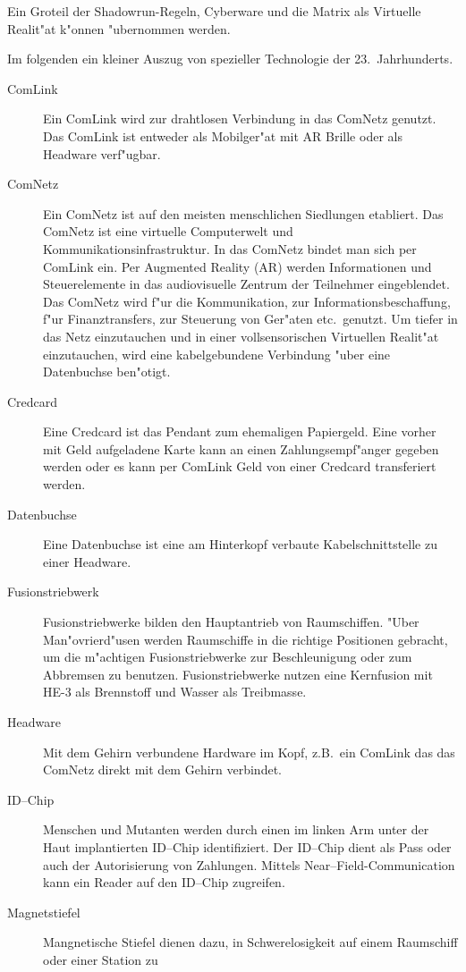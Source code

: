 \begin{appendices}
Ein Gro\3teil der Shadowrun-Regeln, Cyberware und die Matrix als Virtuelle Realit"at k"onnen "ubernommen werden.

Im folgenden ein kleiner Auszug von spezieller Technologie der 23.~Jahrhunderts.

\begin{description}
\item [ComLink] Ein ComLink wird zur drahtlosen Verbindung in das ComNetz genutzt. Das ComLink ist entweder als
      Mobilger"at mit AR Brille oder als Headware verf"ugbar.
\item [ComNetz] Ein ComNetz ist auf den meisten menschlichen Siedlungen etabliert. Das ComNetz ist eine virtuelle
      Computerwelt und Kommunikationsinfrastruktur. In das ComNetz bindet man sich per ComLink ein. Per Augmented Reality (AR) werden Informationen und Steuerelemente in das audiovisuelle Zentrum der Teilnehmer eingeblendet. Das ComNetz wird f"ur die Kommunikation, zur Informationsbeschaffung, f"ur Finanztransfers, zur Steuerung von Ger"aten etc.~genutzt. Um tiefer in das Netz einzutauchen und in einer vollsensorischen Virtuellen Realit"at einzutauchen, wird eine kabelgebundene Verbindung "uber eine Datenbuchse ben"otigt.
\item [Credcard] Eine Credcard ist das Pendant zum ehemaligen Papiergeld. Eine vorher mit Geld aufgeladene Karte kann an
      einen Zahlungsempf"anger gegeben werden oder es kann per ComLink Geld von einer Credcard transferiert werden.
\item [Datenbuchse] Eine Datenbuchse ist eine am Hinterkopf verbaute Kabelschnittstelle zu einer Headware.
\item [Fusionstriebwerk] Fusionstriebwerke bilden den Hauptantrieb von Raumschiffen. "Uber Man"ovrierd"usen werden
      Raumschiffe in die richtige Positionen gebracht, um die m"achtigen Fusionstriebwerke zur Beschleunigung oder zum Abbremsen zu benutzen. Fusionstriebwerke nutzen eine Kernfusion mit HE-3 als Brennstoff und Wasser als Treibmasse.
\item [Headware] Mit dem Gehirn verbundene Hardware im Kopf, z.B.~ein ComLink das das ComNetz direkt mit dem Gehirn
      verbindet.
\item [ID--Chip] Menschen und Mutanten werden durch einen im linken Arm unter der Haut implantierten ID--Chip
      identifiziert. Der ID--Chip dient als Pass oder auch der Autorisierung von Zahlungen. Mittels Near--Field-Communication kann ein Reader auf den ID--Chip zugreifen.
\item [Magnetstiefel] Mangnetische Stiefel dienen dazu, in Schwerelosigkeit auf einem Raumschiff oder einer Station zu

\end{description}
\end{appendices}

